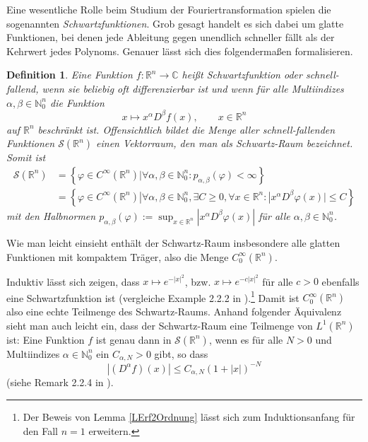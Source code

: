 \documentclass[12pt,a4paper]{scrartcl}
\newtheorem{Satz}{Satz}[section]
\newtheorem{Def}[Satz]{Definition}
\newcommand{\dd}{\mathrm{d}}
\numberwithin{equation}{section}
\newcommand{\C}{\mathbb{C}} %
\newcommand{\R}{\mathbb{R}} %
\newcommand{\N}{\mathbb{N}} %
\newcommand{\Sc}{\mathcal{S}} %
\begin{document}
Eine wesentliche Rolle beim Studium der Fouriertransformation spielen die sogenannten \emph{Schwartzfunktionen}. Grob gesagt handelt es sich dabei um glatte Funktionen, bei denen jede Ableitung gegen unendlich schneller fällt als der Kehrwert jedes Polynoms. Genauer lässt sich dies folgendermaßen formalisieren.    
\begin{Def}
Eine Funktion $f: \R^n \to \C$ heißt \emph{Schwartzfunktion} oder \emph{schnell-fallend}, wenn sie beliebig oft differenzierbar ist und wenn für alle Multiindizes $\alpha, \beta \in \N_0^n$ die Funktion \[
x \mapsto x^\alpha D^\beta f(x), \qquad x \in \R^n
\] auf $\R^n$ beschränkt ist.
Offensichtlich bildet die Menge aller schnell-fallenden Funktionen $\Sc(\R^n)$ einen Vektorraum, den man als Schwartz-Raum bezeichnet. Somit ist
\begin{align*}
\Sc(\R^n) &= \left\lbrace  \varphi \in C^\infty (\R^n) | \forall \alpha, \beta \in \N_0^n : p_{\alpha,\beta}(\varphi) < \infty\right\rbrace \\
&=\left\lbrace  \varphi \in C^\infty (\R^n) | \forall \alpha, \beta \in \N_0^n , \exists C \geq 0, \forall x\in \R^n :|x^\alpha D^\beta \varphi(x)| \leq C \right\rbrace
\end{align*}
mit den Halbnormen $ p_{\alpha,\beta}(\varphi) := \sup_{x\in \R^n}|x^\alpha D^\beta \varphi(x)|$ für alle $\alpha, \beta \in \N_0^n$.
\end{Def}

Wie man leicht einsieht enthält der Schwartz-Raum insbesondere alle glatten Funktionen mit kompaktem Träger, also die Menge $C_0^\infty (\R^n)$.
 
Induktiv lässt sich zeigen, dass $x \mapsto e^{-|x|^2}$, bzw. $x \mapsto e^{-c|x|^2}$ für alle $c>0$ ebenfalls eine Schwartzfunktion ist (vergleiche Example 2.2.2 in \cite{Grafakos}).\footnote{Der Beweis von Lemma \ref{LErf2Ordnung} lässt sich zum Induktionsanfang für den Fall $n=1$ erweitern.} Damit ist $C_0^\infty (\R^n)$ also eine echte Teilmenge des Schwartz-Raums. 
Anhand folgender Äquivalenz sieht man auch leicht ein, dass der Schwartz-Raum eine Teilmenge von $L^1(\R^n)$ ist:
Eine Funktion $f $ ist genau dann in $\Sc(\R^n)$, wenn es für alle $N>0$ und Multiindizes $\alpha \in \N_0^n$ ein $C_{\alpha,N}>0$ gibt, so dass 
\[
|(D^\alpha f)(x)| \leq C_{\alpha,N} (1 + |x|)^{-N}
\] (siehe Remark 2.2.4 in \cite{Grafakos}).
\end{document}
